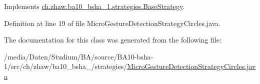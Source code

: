 Implements \hyperlink{classch_1_1zhaw_1_1ba10__bsha__1_1_1strategies_1_1BaseStrategy_a0496e8fd0099a5f0f7765322d7e752a9}{ch.zhaw.ba10\_\-bsha\_\-1.strategies.BaseStrategy}.

Definition at line 19 of file MicroGestureDetectionStrategyCircles.java.

The documentation for this class was generated from the following file:\begin{DoxyCompactItemize}
\item 
/media/Daten/Studium/BA/source/BA10-\/bsha-\/1/src/ch/zhaw/ba10\_\-bsha\_/strategies/\hyperlink{MicroGestureDetectionStrategyCircles_8java}{MicroGestureDetectionStrategyCircles.java}\end{DoxyCompactItemize}
